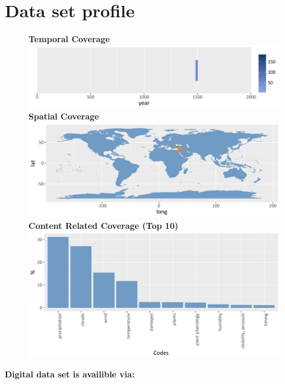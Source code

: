 \chapter*{Data set profile}
\begin{figure}[H]
	\begin{center}
\textbf{Temporal Coverage}	
 \includegraphics[width=1\textwidth]{fig/datasetprofile/example_year_2000.pdf}
\textbf{ Spatial Coverage}	
 \includegraphics[width=1\textwidth]{fig/datasetprofile/example_world.pdf}
\textbf{Content Related Coverage (Top 10)}	
 \includegraphics[width=1\textwidth]{fig/datasetprofile/example_content.pdf}
  \end{center}
\end{figure}
\vspace*{\fill}
\noindent
\textbf{Digital data set is availible via:} \href{dx.\ExecuteMetaData[variables.tex]{doidata}}{}